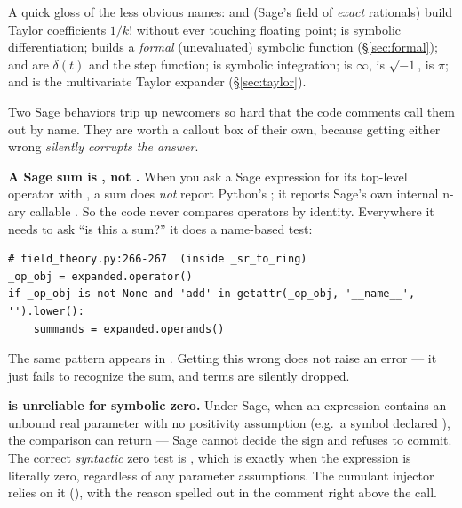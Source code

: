 A quick gloss of the less obvious names:  and  (Sage's
field of \emph{exact} rationals) build Taylor coefficients $1/k!$ without ever
touching floating point;  is symbolic differentiation; 
builds a \emph{formal} (unevaluated) symbolic function (\S\ref{sec:formal});
 and  are $\delta(t)$ and the step function;
 is symbolic integration;  is $\infty$,  is
$\sqrt{-1}$,  is $\pi$; and  is the multivariate Taylor
expander (\S\ref{sec:taylor}).

Two Sage behaviors trip up newcomers so hard that the code comments call them out
by name. They are worth a callout box of their own, because getting either wrong
\emph{silently corrupts the answer}.

\begin{gotcha}
\textbf{A Sage sum is , not .} When you ask a
Sage expression for its top-level operator with , a sum does
\emph{not} report Python's ; it reports Sage's own internal
n-ary callable . So the code never compares operators by
identity. Everywhere it needs to ask ``is this a sum?'' it does a name-based test:
\begin{lstlisting}
# field_theory.py:266-267  (inside _sr_to_ring)
_op_obj = expanded.operator()
if _op_obj is not None and 'add' in getattr(_op_obj, '__name__', '').lower():
    summands = expanded.operands()
\end{lstlisting}
The same pattern appears in . Getting this wrong does not
raise an error --- it just fails to recognize the sum, and terms are silently
dropped.
\end{gotcha}

\begin{gotcha}
\textbf{ is unreliable for symbolic zero.} Under Sage, when an
expression contains an unbound real parameter with no positivity assumption (e.g.\
a symbol declared ), the comparison  can return
\code{False} --- Sage cannot decide the sign and refuses to commit. The correct
\emph{syntactic} zero test is \code{.is\_trivial\_zero()}, which is \code{True}
exactly when the expression is literally zero, regardless of any parameter
assumptions. The cumulant injector relies on it (),
with the reason spelled out in the comment right above the call.
\end{gotcha}

